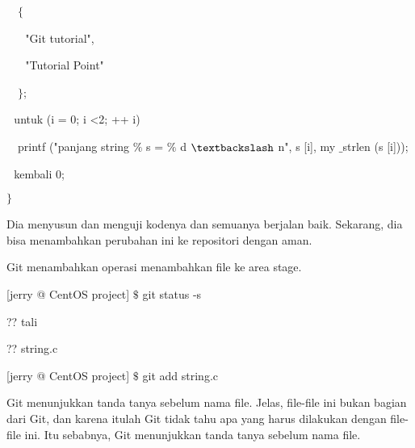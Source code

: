 \noindent 
 \hspace*{0.5in}  $  $ $  $ $  $ $  \{  $ \par
\noindent 
 \hspace*{0.5in}  $  $ $  $ $  $ $  $ $  $ $  $"Git tutorial", \par
\noindent 
 \hspace*{0.5in}  $  $ $  $ $  $ $  $ $  $ $  $"Tutorial Point" \par
\noindent 
 \hspace*{0.5in}  $  $ $  $ $  $ $  \}  $; \par
\noindent 
 \hspace*{0.5in}  $  $ $  $ $  $untuk (i = 0; i <2; ++ i) $  $ $  $ $  $ $  $ $  $ $  $ \par
\noindent 
 $  $ $  $ $  $ \hspace*{0.5in} printf ("panjang string $  \%  $ s = $  \%  $ d  $  \textbackslash  $ n", s [i], my $  \_  $strlen (s [i])); \par
\noindent 
 \hspace*{0.5in}  $  $ $  $ $  $kembali 0; \par
\noindent 
 \hspace*{0.5in}  $  \}  $ \par
\noindent 
 \hspace*{0.5in} \vspace{12pt}
\noindent 
Dia menyusun dan menguji kodenya dan semuanya berjalan baik. Sekarang, dia bisa menambahkan perubahan ini ke repositori dengan aman. \par
\noindent 
Git menambahkan operasi menambahkan file ke area stage. \par
\noindent 
 \hspace*{0.5in} [jerry @ CentOS project]  $  \$  $ git status -s \par
\noindent 
 \hspace*{0.5in} ?? tali \par
\noindent 
 \hspace*{0.5in} ?? string.c \par
\noindent 
 \hspace*{0.5in} [jerry @ CentOS project]  $  \$  $ git add string.c \par
\vspace{12pt}
\noindent 
Git menunjukkan tanda tanya sebelum nama file. Jelas, file-file ini bukan bagian dari Git, dan karena itulah Git tidak tahu apa yang harus dilakukan dengan file-file ini. Itu sebabnya, Git menunjukkan tanda tanya sebelum nama file. \par
